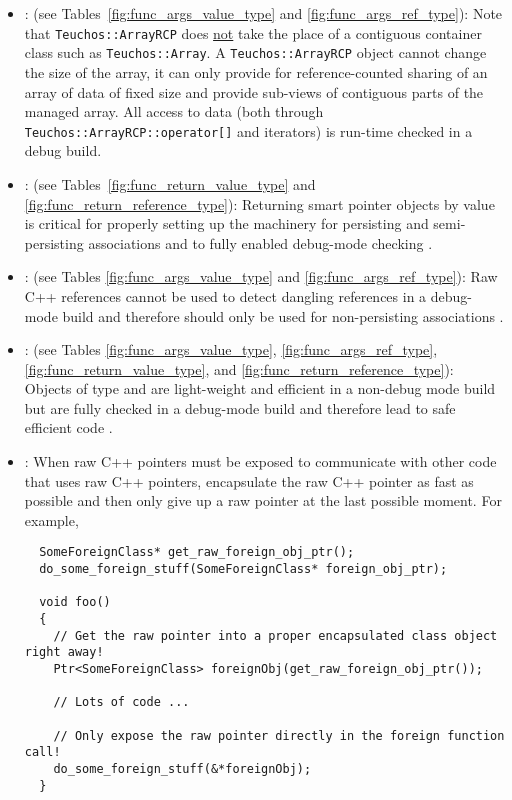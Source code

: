 \begin{itemize}
{}\item\GCGTeuchosArrayRCP: (see Tables~\ref{fig:func_args_value_type} and
{}\ref{fig:func_args_ref_type}): Note that {}\texttt{Teuchos::ArrayRCP} does
{}\underline{not} take the place of a contiguous container class such as
{}\texttt{Teuchos::\-Array}.  A {}\texttt{Teuchos::ArrayRCP} object cannot
change the size of the array, it can only provide for reference-counted
sharing of an array of data of fixed size and provide sub-views of contiguous
parts of the managed array.  All access to data (both through
{}\texttt{Teuchos::\-ArrayRCP::\-operator[]} and iterators) is run-time checked
in a debug build.


{}\item\GCGReturnSmartPointersByValue: (see
Tables~\ref{fig:func_return_value_type} and
{}\ref{fig:func_return_reference_type}): Returning smart pointer
objects by value is critical for properly setting up the machinery for
persisting and semi-persisting associations and to fully enabled
debug-mode checking {}\cite{TeuchosMemoryManagementGuide}.


{}\item\GCGRawReferencesNonPersisting: (see Tables
{}\ref{fig:func_args_value_type} and {}\ref{fig:func_args_ref_type}):
Raw C++ references cannot be used to detect dangling references in a
debug-mode build and therefore should only be used for non-persisting
associations {}\cite{TeuchosMemoryManagementGuide}.


{}\item\GCGSemiPersisting: (see Tables
{}\ref{fig:func_args_value_type}, {}\ref{fig:func_args_ref_type},
{}\ref{fig:func_return_value_type}, and
{}\ref{fig:func_return_reference_type}): Objects of type {}
and {} are light-weight and efficient in a non-debug
mode build but are fully checked in a debug-mode build and therefore
lead to safe efficient code {}\cite{TeuchosMemoryManagementGuide}.


{}\item\GCGPostponeRawPointers: When raw C++ pointers must be exposed to
communicate with other code that uses raw C++ pointers, encapsulate the raw
C++ pointer as fast as possible and then only give up a raw pointer at the
last possible moment.  For example,

{\small\begin{verbatim}
  SomeForeignClass* get_raw_foreign_obj_ptr();
  do_some_foreign_stuff(SomeForeignClass* foreign_obj_ptr);

  void foo()
  {
    // Get the raw pointer into a proper encapsulated class object right away!
    Ptr<SomeForeignClass> foreignObj(get_raw_foreign_obj_ptr());

    // Lots of code ...

    // Only expose the raw pointer directly in the foreign function call! 
    do_some_foreign_stuff(&*foreignObj);
  }
\end{verbatim}}


\end{itemize}


